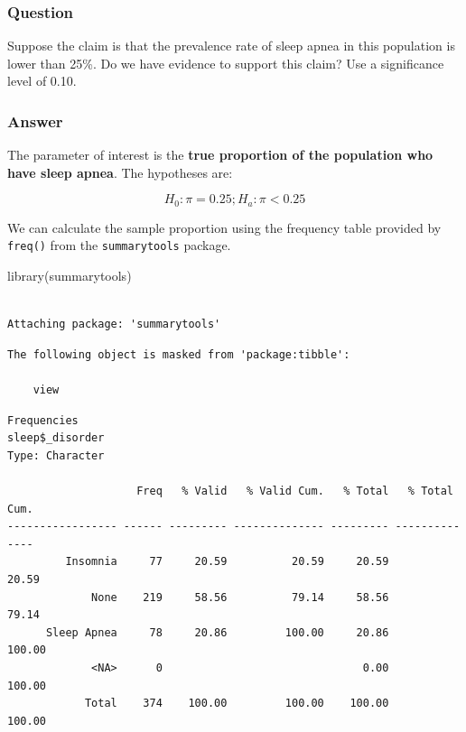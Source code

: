 \documentclass[
  letterpaper,
  DIV=11,
  numbers=noendperiod]{scrartcl}
\newenvironment{Shaded}{\begin{snugshade}}{\end{snugshade}}
\newcommand{\FunctionTok}[1]{\textcolor[rgb]{0.28,0.35,0.67}{#1}}
\newcommand{\NormalTok}[1]{\textcolor[rgb]{0.00,0.23,0.31}{#1}}
\newcommand{\SpecialCharTok}[1]{\textcolor[rgb]{0.37,0.37,0.37}{#1}}
\begin{document}
\subsubsection{Question}

Suppose the claim is that the prevalence rate of sleep apnea in this
population is lower than 25\%. Do we have evidence to support this
claim? Use a significance level of 0.10.

\subsubsection{Answer}

The parameter of interest is the \textbf{true proportion of the
population who have sleep apnea}. The hypotheses are:

\[
H_0: \pi = 0.25; H_a: \pi < 0.25
\]

We can calculate the sample proportion using the frequency table
provided by \texttt{freq()} from the \texttt{summarytools} package.

\begin{Shaded}
\begin{Highlighting}[]
\FunctionTok{library}\NormalTok{(summarytools)}
\end{Highlighting}
\end{Shaded}

\begin{verbatim}

Attaching package: 'summarytools'
\end{verbatim}

\begin{verbatim}
The following object is masked from 'package:tibble':

    view
\end{verbatim}

\begin{Shaded}
\end{Shaded}

\begin{verbatim}
Frequencies  
sleep$_disorder  
Type: Character  

                    Freq   % Valid   % Valid Cum.   % Total   % Total Cum.
----------------- ------ --------- -------------- --------- --------------
         Insomnia     77     20.59          20.59     20.59          20.59
             None    219     58.56          79.14     58.56          79.14
      Sleep Apnea     78     20.86         100.00     20.86         100.00
             <NA>      0                               0.00         100.00
            Total    374    100.00         100.00    100.00         100.00
\end{verbatim}
\end{document}
